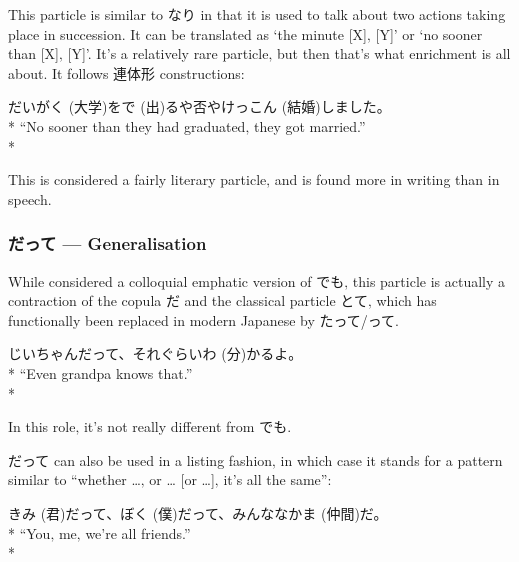 \documentclass[11pt, b5paper, twoside, openright, onecolumn]{book}
\makeatletter
\newcommand*{\rubystack}[2]{{\relscale{0.5}%
  \begin{tabular}[b]{@{}c@{}}%
    {#1}\\%
   {\textscale{2}{#2}}%
  \end{tabular}}%
}
\DeclareRobustCommand*{\ruby}[2]{%
  \mbox{%
    \setlength{\parskip}{0ex}%
    \BeginAccSupp{method=pdfstringdef,ActualText={#1}}%
      \rubystack{\phantom{#2}}{#1}%
      \llap{%
        \rubystack{#2}{\phantom{#1}}%
      }%
    \EndAccSupp{}%
  }%
}
\renewcommand*{\ruby}[2]{#2 (#1)}%
\newenvironment{exampleblock}{
\setlength{\parindent}{0.6in}
\begin{minipage}[t]{\dimexpr\textwidth-\parindent}}
{\end{minipage}}
\makeatother
\begin{document}
This particle is similar to なり in that it is used to talk about two actions taking place in succession. It can be translated as ‘the minute [X]‚ [Y]’ or ‘no sooner than [X]‚ [Y]’. It’s a relatively rare particle‚ but then that’s what enrichment is all about. It follows 連体形 constructions:

\vspace{0.4cm}
\begin{exampleblock}
\ruby{大学}{だいがく}を\ruby{出}{で}るや否や\ruby{結婚}{けっこん}しました。 \\* 
“No sooner than they had graduated‚ they got married.” \\* 
\end{exampleblock}
\vspace{0.2cm}

This is considered a fairly literary particle‚ and is found more in writing than in speech.

\subsubsection{だって — Generalisation}

While considered a colloquial emphatic version of でも‚ this particle is actually a contraction of the copula だ and the classical particle とて‚ which has functionally been replaced in modern Japanese by たって/って.

\vspace{0.4cm}
\begin{exampleblock}
じいちゃんだって、それぐらい\ruby{分}{わ}かるよ。 \\* 
“Even grandpa knows that.” \\* 
\end{exampleblock}
\vspace{0.2cm}

In this role‚ it’s not really different from でも.

だって can also be used in a listing fashion‚ in which case it stands for a pattern similar to “whether …‚ or … [or …]‚ it’s all the same”:

\vspace{0.4cm}
\begin{exampleblock}
\ruby{君}{きみ}だって、\ruby{僕}{ぼく}だって、みんな\ruby{仲間}{なかま}だ。 \\* 
“You‚ me‚ we’re all friends.” \\* 
\end{exampleblock}
\vspace{0.2cm}
\end{document}
